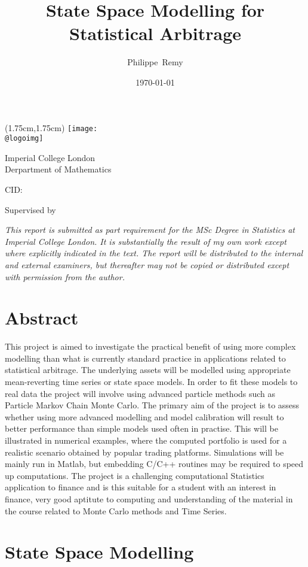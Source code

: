 \documentclass[11pt,a4,twosided,singlespacing,titlepagenumber=on]{scrreprt}
\title{State Space Modelling for Statistical Arbitrage}
\author{Philippe~Remy}
\date{\today}
\makeatletter
\numberwithin{equation}{chapter} %
\theoremstyle{remark}
\renewcommand{\maketitle}{
\begin{titlepage}
\ifdefined\@logoimg
\begin{textblock*}{8cm}(1.75cm,1.75cm)
\texttt{[image: \\@logoimg]}
\end{textblock*}
\vspace*{1cm}
\else
\fi
\begin{center}
\vspace*{\stretch{0.1}}
Imperial College London\\
Derpartment of Mathematics\par
\vspace*{\stretch{1}} %
{\titlefont\Huge \@title\par} %
\vspace*{\stretch{2}}
{\Large \@author \par}
\vspace*{1em}
{\large CID: \@CID \par}
\vspace*{\stretch{0.5}}
{\large Supervised by \@supervisor \par}
\vspace*{\stretch{3}}
{\Large \@date \par}
\vspace*{\stretch{1}}

\textit{This report is submitted as part requirement for the MSc Degree in Statistics at Imperial College London. It is substantially the result of my own work except where explicitly indicated in the text.
The report will be distributed to the internal and external examiners, but thereafter may not be
copied or distributed except with permission from the author.}
\vspace*{\stretch{0.1}}
\end{center}%
\end{titlepage}%
}
\renewenvironment{abstract}%
{\chapter*{Abstract}\thispagestyle{plain}}%
{\clearpage}
\newenvironment{myquote}%
{\begin{quote}{\Large{}``}}%
{\ifhmode\unskip\fi{\Large{}''}\end{quote}}
\makeatother
\begin{document}
\maketitle

\declaration

\begin{abstract}
This project is aimed to investigate the practical benefit of using more complex modelling than what is currently standard practice in applications related to statistical arbitrage. The underlying assets will be modelled using appropriate mean-reverting time series or state space models. In order to fit these models to real data the project will involve using advanced particle methods such as Particle Markov Chain Monte Carlo. The primary aim of the project is to assess whether using more advanced modelling and model calibration will result to better performance than simple models used often in practise. This will be illustrated in numerical examples, where the computed portfolio is used for a realistic scenario obtained by popular trading platforms. Simulations will be mainly run in Matlab, but embedding C/C++ routines may be required to speed up computations. The project is a challenging computational Statistics application to finance and is this suitable for a student with an interest in finance, very good aptitute to computing and understanding of the material in the course related to Monte Carlo methods and Time Series.
\end{abstract}
\newpage




\chapter{State Space Modelling}
\end{document}
